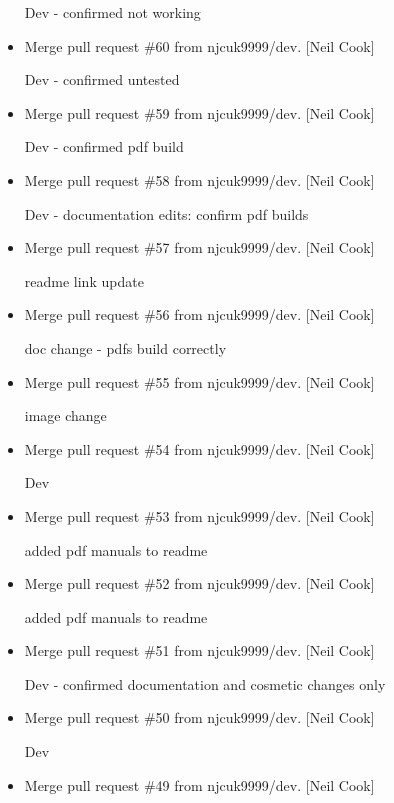 \documentclass[a4paper,10pt,english]{report}
\begin{document}
\begin{itemize}
Dev - confirmed  not working

\item {} 
Merge pull request \#60 from njcuk9999/dev. {[}Neil Cook{]}

Dev - confirmed untested 

\item {} 
Merge pull request \#59 from njcuk9999/dev. {[}Neil Cook{]}

Dev - confirmed pdf build

\item {} 
Merge pull request \#58 from njcuk9999/dev. {[}Neil Cook{]}

Dev - documentation edits: confirm pdf builds

\item {} 
Merge pull request \#57 from njcuk9999/dev. {[}Neil Cook{]}

readme link update

\item {} 
Merge pull request \#56 from njcuk9999/dev. {[}Neil Cook{]}

doc change - pdfs build correctly

\item {} 
Merge pull request \#55 from njcuk9999/dev. {[}Neil Cook{]}

image change

\item {} 
Merge pull request \#54 from njcuk9999/dev. {[}Neil Cook{]}

Dev

\item {} 
Merge pull request \#53 from njcuk9999/dev. {[}Neil Cook{]}

added pdf manuals to readme

\item {} 
Merge pull request \#52 from njcuk9999/dev. {[}Neil Cook{]}

added pdf manuals to readme

\item {} 
Merge pull request \#51 from njcuk9999/dev. {[}Neil Cook{]}

Dev - confirmed documentation and cosmetic changes only

\item {} 
Merge pull request \#50 from njcuk9999/dev. {[}Neil Cook{]}

Dev

\item {} 
Merge pull request \#49 from njcuk9999/dev. {[}Neil Cook{]}


\end{itemize}
\end{document}
